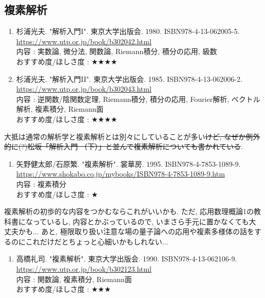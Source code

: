 \documentclass[10pt,a4paper]{jsarticle}
\begin{document}
\subsection{複素解析}
    \begin{enumerate}
        \renewcommand{\theenumi}{[CA\arabic{enumi}]}
        \renewcommand{\labelenumi}{\theenumi}
        \setcounter{enumi}{0}
        \item \label{SMCA1} 杉浦光夫. "解析入門I". 東京大学出版会. 1980. ISBN978-4-13-062005-5. \\
        \url{https://www.utp.or.jp/book/b302042.html} \\
        内容 : 実数論, 微分法, 関数論, Riemann積分, 積分の応用, 級数\\
        おすすめ度/ほしさ度 : $\bigstar \bigstar \bigstar \bigstar $
        \item \label{SMCA2} 杉浦光夫. "解析入門II". 東京大学出版会. 1985. ISBN978-4-13-062006-2. \\
        \url{https://www.utp.or.jp/book/b302043.html} \\
        内容 : 逆関数/陰関数定理, Riemann積分, 積分の応用, Fourier解析, ベクトル解析, 複素積分, Riemann面\\
        おすすめ度/ほしさ度 : $\bigstar \bigstar \bigstar \bigstar $
    \end{enumerate}\par 
    大抵は通常の解析学と複素解析とは別々にしていることが多い\sout{けど, なぜか例外的に(?)松坂「解析入門 （下）」と並んで複素解析についても書かれている}. 
    \begin{enumerate}
        \renewcommand{\theenumi}{[CA\arabic{enumi}]}
        \renewcommand{\labelenumi}{\theenumi}
        \setcounter{enumi}{2}
        \item \label{YKCA} 矢野健太郎/石原繁. "複素解析". 裳華房. 1995. ISBN978-4-7853-1089-9. \\
        \url{https://www.shokabo.co.jp/mybooks/ISBN978-4-7853-1089-9.htm} \\
        内容 : 複素積分\\
        おすすめ度/ほしさ度 : $\bigstar $
    \end{enumerate}\par 
    複素解析の初歩的な内容をつかむならこれがいいかも. ただ, 応用数理概論1の教科書になっているし, 内容とかぶっているので, いまさら手元に置かなくても大丈夫かも... あと, 極限取り扱い注意な場の量子論への応用や複素多様体の話をするのにこれだけだとちょっと心細いかもしれない... 
    \begin{enumerate}
        \renewcommand{\theenumi}{[CA\arabic{enumi}]}
        \renewcommand{\labelenumi}{\theenumi}
        \setcounter{enumi}{3}
        \item \label{TRCA} 高橋礼司. "複素解析". 東京大学出版会. 1990. ISBN978-4-13-062106-9. \\
        \url{https://www.utp.or.jp/book/b302123.html} \\
        内容 : 関数論, 複素積分, Riemann面\\
        おすすめ度/ほしさ度 : $\bigstar \bigstar \bigstar $
    \end{enumerate}\par 
\end{document}
